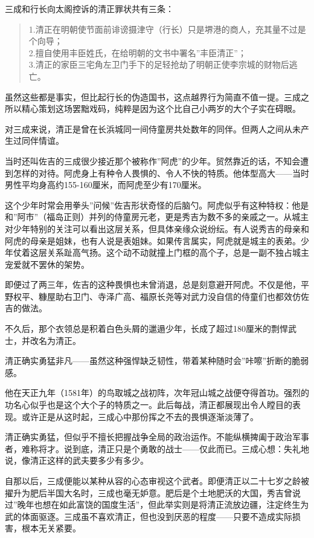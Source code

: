 \documentclass[
]{article}
\begin{document}
三成和行长向太阁控诉的清正罪状共有三条：

\begin{quote}
1.清正在明朝使节面前诽谤摄津守（行长）只是堺港的商人，充其量不过是个向导；\\
2.擅自使用丰臣姓氏，在给明朝的文书中署名''丰臣清正''；\\
3.清正的家臣三宅角左卫门手下的足轻抢劫了明朝正使李宗城的财物后逃亡。
\end{quote}

虽然这些都是事实，但比起行长的伪造国书，这点越界行为简直不值一提。三成之所以精心策划这场罢黜戏码，纯粹是因为这个比自己小两岁的大个子实在碍眼。

对三成来说，清正是曾在长浜城同一间侍童房共处数年的同伴。但两人之间从未产生过同伴情谊。

当时还叫佐吉的三成很少接近那个被称作''阿虎''的少年。贸然靠近的话，不知会遭到怎样的对待。阿虎身上有种令人畏惧的、令人不快的特质。他体型高大------当时男性平均身高约155-160厘米，而阿虎至少有170厘米。

这个少年时常会用拳头''问候''佐吉形状奇怪的后脑勺。阿虎似乎有这种特权：他是和''阿市''（福岛正则）并列的侍童房元老，更是秀吉为数不多的亲戚之一。从城主对少年特别的关注可以看出这层关系，但具体亲缘众说纷纭。有人说秀吉的母亲和阿虎的母亲是姐妹，也有人说是表姐妹。如果传言属实，阿虎就是城主的表弟。少年仗着这层关系趾高气扬。这个动不动就撞上门框的高个子，总是一副不独占城主宠爱就不罢休的架势。

即便过了两三年，佐吉的这种畏惧也未曾消退，总是刻意避开阿虎。不仅是他，平野权平、糠屋助右卫门、寺泽广高、福原长尧等对武力没自信的侍童们也都效仿佐吉的做法。

不久后，那个衣领总是积着白色头屑的邋遢少年，长成了超过180厘米的剽悍武士，并改名为清正。

清正确实勇猛非凡------虽然这种强悍缺乏韧性，带着某种随时会''咔嚓''折断的脆弱感。

他在天正九年（1581年）的鸟取城之战初阵，次年冠山城之战便夺得首功。强烈的功名心似乎也是这个大个子的特质之一。此后每战，清正都展现出令人瞠目的表现。或许正是从这时起，三成心中那份挥之不去的畏惧逐渐淡薄了。

清正确实勇猛，但似乎不擅长把握战争全局的政治运作。不能纵横捭阖于政治军事者，难称将才。说到底，清正只是个勇敢的战士------仅此而已。三成心想：失礼地说，像清正这样的武夫要多少有多少。

自那以后，三成便能以某种从容的心态审视这个武者。即便清正以二十七岁之龄被擢升为肥后半国大名时，三成也毫无妒意。肥后是个土地肥沃的大国，秀吉曾说过''晚年也想在如此富饶的国度生活''，但此举实则是将清正流放边疆，注定终生为武的体面驱逐。三成虽不喜欢清正，但也没到厌恶的程度------只要不造成实际损害，根本无关紧要。
\end{document}
